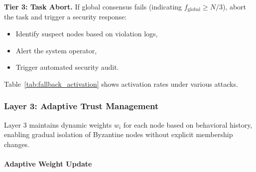 \documentclass[lettersize,journal]{IEEEtran}
\begin{document}
\textbf{Tier 3: Task Abort.}
If global consensus fails (indicating $f_{\text{global}} \geq N/3$),
abort the task and trigger a security response:
\begin{itemize}
\item Identify suspect nodes based on violation logs,
\item Alert the system operator,
\item Trigger automated security audit.
\end{itemize}

Table~\ref{tab:fallback_activation} shows activation rates under various attacks.

\begin{table}[h]
\centering
\caption{Fallback Tier Activation Rates (10,000 tasks, $N=50$)}
\label{tab:fallback_activation}
\small
{}
\end{table}

\subsubsection{Layer 3: Adaptive Trust Management}
\label{sec:layer3}

Layer 3 maintains dynamic weights $w_i$ for each node
based on behavioral history, enabling gradual isolation of Byzantine nodes
without explicit membership changes.

\paragraph{Adaptive Weight Update}
\label{sec:weight_update}
\end{document}
